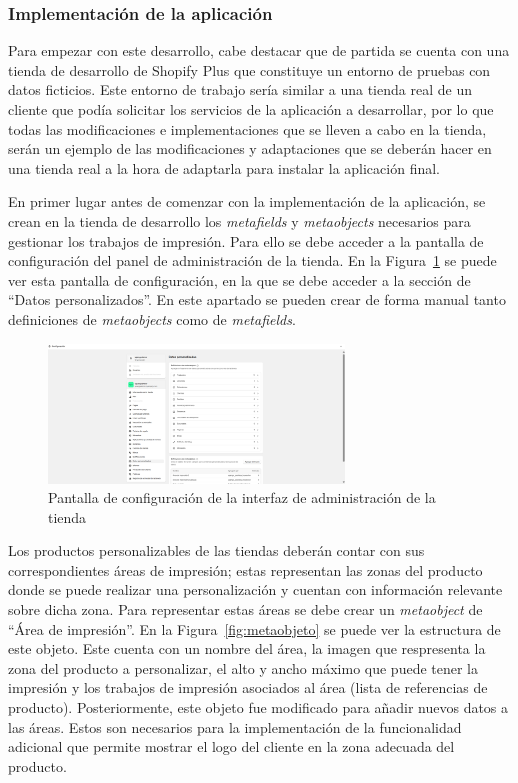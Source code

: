 \documentclass[11pt]{article}
\begin{document}
\subsubsection{Implementación de la aplicación}

Para empezar con este desarrollo, cabe destacar que de partida se cuenta con una tienda de desarrollo de Shopify Plus que constituye un entorno de pruebas con datos ficticios.
Este entorno de trabajo sería similar a una tienda real de un cliente que podía solicitar los servicios de la aplicación a desarrollar, por lo que todas las modificaciones e implementaciones
que se lleven a cabo en la tienda, serán un ejemplo de las modificaciones y adaptaciones que se deberán hacer en una tienda real a la hora de adaptarla para instalar la aplicación final.

En primer lugar antes de comenzar con la implementación de la aplicación, se crean en la tienda de desarrollo los \textit{metafields} y \textit{metaobjects} necesarios para gestionar
los trabajos de impresión. Para ello se debe acceder a la pantalla de configuración del panel de administración de la tienda. En la Figura~\ref{fig:configuracionMetafields} se puede ver
esta pantalla de configuración, en la que se debe acceder a la sección de ``Datos personalizados''. En este apartado se pueden crear de forma manual
tanto definiciones de \textit{metaobjects} como de \textit{metafields}.

\begin{figure}[H]
    \centering
    \includegraphics[width=0.7\textwidth]{imagenesUS2/configuracionAdministradorTienda.png}
    \caption{\label{fig:configuracionMetafields}Pantalla de configuración de la interfaz de administración de la tienda}
    \vspace{\fill}
\end{figure}

Los productos personalizables de las tiendas deberán contar con sus correspondientes áreas de impresión; estas representan
las zonas del producto donde se puede realizar una personalización y cuentan con información relevante sobre dicha zona.
Para representar estas áreas se debe crear un \textit{metaobject} de ``Área de impresión''. En la Figura~\ref{fig:metaobjeto} se puede ver la estructura de este 
objeto. Este cuenta con un nombre del área, la imagen que respresenta la zona del producto a personalizar, el alto y ancho máximo que puede tener la impresión y 
los trabajos de impresión asociados al área (lista de referencias de producto). Posteriormente, este objeto fue modificado para añadir nuevos datos a las áreas. Estos son necesarios
para la implementación de la funcionalidad adicional que permite mostrar el logo del cliente en la zona adecuada del producto. 
\end{document}
